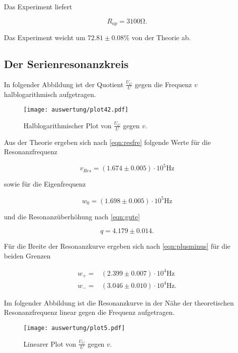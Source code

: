 Das Experiment liefert

\begin{equation}
  R_{ap} = 3100 \si{\ohm}.
  \label{eqn:rapausw2}
\end{equation}

Das Experiment weicht um $72.81 \pm 0.08 \si{\percent}$ von der Theorie ab.

\subsection{Der Serienresonanzkreis}

In folgender Abbildung ist der Quotient $\frac{U_C}{U}$ gegen die Frequenz $v$ halblogarithmisch aufgetragen.

\begin{figure}[H]
  \centering
  \texttt{[image: auswertung/plot42.pdf]}
  \caption{Halblogarithmischer Plot von $\frac{U_C}{U}$ gegen $v$.}
  \label{fig:halbloga}
\end{figure}

Aus der Theorie ergeben sich nach \eqref{eqn:resfre} folgende Werte für die Resonanzfrequenz

\begin{equation}
  v_{Res} = (1.674 \pm 0.005)\cdot 10^5 \si{\hertz}
  \label{eqn:vresausw}
\end{equation}

sowie für die Eigenfrequenz

\begin{equation}
  w_0 = (1.698 \pm 0.005)\cdot 10^5 \si{\hertz}
  \label{eqn:w0ausw}
\end{equation}

und die Resonanzüberhöhung nach \eqref{eqn:gute}

\begin{equation}
  q = 4.179 \pm 0.014.
  \label{eqn:qausw}
\end{equation}

Für die Breite der Resonanzkurve ergeben sich nach \eqref{eqn:plusminus} für die beiden Grenzen

\begin{align}
  w_+ = & (2.399 \pm 0.007) \cdot 10^4 \si{\hertz} \\
  w_- = & (3.046 \pm 0.010) \cdot 10^4 \si{\hertz}.
  \label{eqn:plusminusausw}
\end{align}
\noindent

Im folgender Abbildung ist die Resonanzkurve in der Nähe der theoretischen Resonanzfrequenz linear
gegen die Frequenz aufgetragen.

\begin{figure}[H]
  \centering
  \texttt{[image: auswertung/plot5.pdf]}
  \caption{Linearer Plot von $\frac{U_C}{U}$ gegen $v$.}
  \label{fig:halbloga}
\end{figure}
